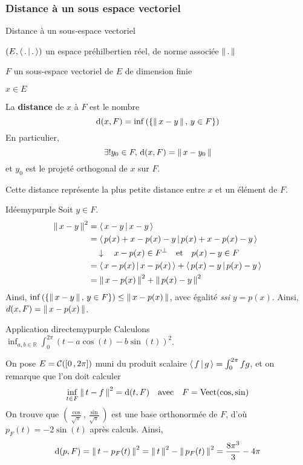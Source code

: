         \subsubsection{Distance à un sous espace vectoriel}

        \begin{defitheo}{Distance à un sous-espace vectoriel}{}
            \begin{soient}
                \item $(E,\left<\,.\,\middle|\,.\,\right>)$ un espace préhilbertien réel, de norme associée $\left\lVert\,.\,\right\rVert$
                \item $F$ un sous-espace vectoriel de $E$ de dimension finie
                \item $x \in E$
            \end{soient}
            La \textbf{distance} de $x$ à $F$ est le nombre 
            \[ \operatorname{d}(x,F)=\inf\left(\left\{\left\lVert\,x-y\,\right\rVert, \, y \in F\right\}\right) \]
            En particulier, 
            \[ \exists ! y_0 \in F, \, \operatorname{d}(x,F) = \left\lVert\,x - y_0\,\right\rVert \] 
            et $y_0$ est le projeté orthogonal de $x$ sur $F$.
        \end{defitheo}

        Cette distance représente la plus petite distance entre $x$ et un élément de $F$. 

        \begin{demo}{Idée}{mypurple}
            Soit $y \in F$.
            \begin{align*}
                \left\lVert\,x - y\,\right\rVert^2 
                &= \left<\,x - y\,\middle|\,x-y\,\right> \\
                &= \left<\,p(x) + x - p(x) - y\,\middle|\,p(x) + x - p(x) - y\,\right> \\
                &\quad \downarrow \quad x - p(x) \in F^{\perp} \quad \text{et} \quad p(x) - y \in F \\
                &= \left<\,x - p(x)\,\middle|\,x - p(x)\,\right> + \left<\,p(x) - y\,\middle|\,p(x) - y\,\right> \\
                &= \left\lVert\,x - p(x)\,\right\rVert^2 + \left\lVert\,p(x) - y\,\right\rVert^2
            \end{align*} 
            Ainsi, $\inf\left(\left\{\left\lVert\,x-y\,\right\rVert, \, y \in F\right\}\right) \leq \left\lVert\,x - p(x)\,\right\rVert$, avec égalité \textit{ssi} $y = p(x)$. Ainsi, $d(x,F) = \left\lVert\,x - p(x)\,\right\rVert$.
        \end{demo}

        \begin{omed}{Application directe}{mypurple}
            Calculons $\inf_{a,b \in \mathbb{R}} \int_{0}^{2\pi} \left(t - a \cos(t) - b \sin(t)\right)^2$.

            On pose $E = \mathcal{C}(\left[ 0 \, , 2\pi \right])$ muni du produit scalaire $\left<\,f\,\middle|\,g\,\right> = \int_{0}^{2\pi} fg$, et on remarque que l’on doit calculer 
            \[ \inf_{t \in F} \left\lVert\,t - f\,\right\rVert^2 = \operatorname{d}(t,F) \quad \text{avec} \quad F = \operatorname{Vect}(\cos, \sin) \]   
            On trouve que $\left(\frac{\cos}{\sqrt{\pi}}, \frac{\sin}{\sqrt{\pi}}\right)$ est une base orthonormée de $F$, d’où $p_F(t) = - 2\sin(t)$ après calculs. Ainsi, 
            \[ \operatorname{d}(p,F) = \left\lVert\,t - p_F(t)\,\right\rVert^2 = \left\lVert\,t\,\right\rVert^2 - \left\lVert\,p_F(t)\,\right\rVert^2 = \frac{8 \pi^3}{3} - 4\pi \]   
        \end{omed}

